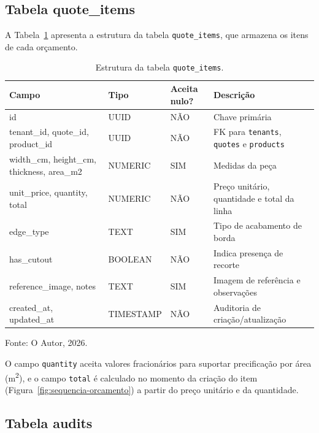 \subsection{Tabela quote\_items}
\label{sec:tabela-quote-items}

A Tabela~\ref{tab:tabela-quote-items} apresenta a estrutura da tabela \texttt{quote\_items}, que armazena os itens de cada orçamento.

\begin{table}[H]
  \centering
  \caption{Estrutura da tabela \texttt{quote\_items}.}
  \label{tab:tabela-quote-items}
  \begin{tabular}{p{3.1cm}p{2.3cm}p{1.6cm}p{5.7cm}}
    \hline
    \textbf{Campo} & \textbf{Tipo} & \textbf{Aceita nulo?} & \textbf{Descrição} \\
    \hline
    id & UUID & NÃO & Chave primária \\
    tenant\_id, quote\_id, product\_id & UUID & NÃO & FK para \texttt{tenants}, \texttt{quotes} e \texttt{products} \\
    width\_cm, height\_cm, thickness, area\_m2 & NUMERIC & SIM & Medidas da peça \\
    unit\_price, quantity, total & NUMERIC & NÃO & Preço unitário, quantidade e total da linha \\
    edge\_type & TEXT & SIM & Tipo de acabamento de borda \\
    has\_cutout & BOOLEAN & NÃO & Indica presença de recorte \\
    reference\_image, notes & TEXT & SIM & Imagem de referência e observações \\
    created\_at, updated\_at & TIMESTAMP & NÃO & Auditoria de criação/atualização \\
    \hline
  \end{tabular}
  \begin{minipage}{0.95\textwidth}
    \vspace{0.3em}
    {\small Fonte: O Autor, 2026.}
  \end{minipage}
\end{table}

O campo \texttt{quantity} aceita valores fracionários para suportar precificação por área (m\textsuperscript{2}), e o campo \texttt{total} é calculado no momento da criação do item (Figura~\ref{fig:sequencia-orcamento}) a partir do preço unitário e da quantidade.

\subsection{Tabela audits}
\label{sec:tabela-audits}

